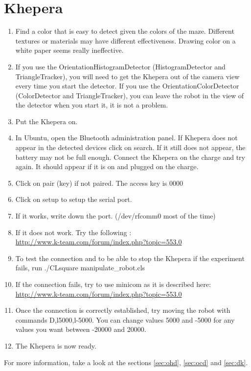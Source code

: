 \section{Khepera}
\label{sec:howto:khepera}

    \begin{enumerate}
        \item Find a color that is easy to detect given the colors of 
            the maze. Different textures or materials may have different 
            effectiveness. Drawing color on a white paper seems really 
            ineffective.
        \item If you use the OrientationHistogramDetector 
            (HistogramDetector and TriangleTracker), you will need 
            to get the Khepera out of the camera view every time you 
            start the detector. If you use the OrientationColorDetector 
            (ColorDetector and TriangleTracker), you can leave the robot 
            in the view of the detector when you start it, it is not a 
            problem.
        \item Put the Khepera on. 
        \item In Ubuntu, open the Bluetooth administration panel. If 
            Khepera does not appear in the detected devices click on 
            search. If it still does not appear, the battery may not be 
            full enough. Connect the Khepera on the charge and try 
            again. It should appear if it is on and plugged on the charge.
        \item Click on pair (key) if not paired. The access key is 0000
        \item Click on setup to setup the serial port.
        \item If it works, write down the port. (/dev/rfcomm0 most of the 
            time)
        \item If it does not work. Try the following : \\
            \url{http://www.k-team.com/forum/index.php?topic=553.0}
        \item To test the connection and to be able to stop the Khepera 
            if the \clsquare{} experiment fails, run 
                ./CLsquare manipulate\_robot.cls
        \item If the connection fails, try to use minicom as it is 
            described here:  \\
            \url{http://www.k-team.com/forum/index.php?topic=553.0}
        \item Once the connection is correctly established, try moving 
            the robot with commands D,l5000,l-5000. You can change 
            values 5000 and -5000 for any values you want between -20000 
            and 20000. 
        \item The Khepera is now ready.
    \end{enumerate}

For more information, take a look at the sections \ref{sec:ohd}, 
\ref{sec:ocd} and \ref{sec:dk}.
